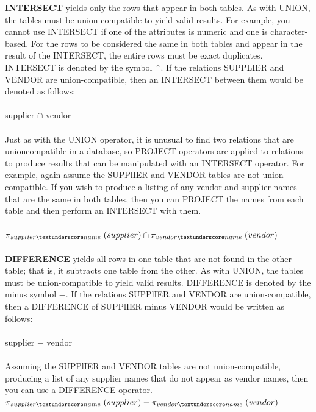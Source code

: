 \documentclass[a4paper, 12pt, titlepage]{report}
\begin{document}
{\textbf{INTERSECT} yields only the rows that appear in both tables. As with UNION, the tables must be union-compatible to yield valid results. For example, you cannot use INTERSECT if one of the attributes is numeric and one is character-based. For the rows
to be considered the same in both tables and appear in the result of the INTERSECT, the entire rows must be exact duplicates. INTERSECT is denoted by the symbol $\cap$. If the relations SUPPLIER and VENDOR are union-compatible, then an INTERSECT between them would be denoted as follows:\\ \\
supplier $\cap$ vendor\\ \\
Just as with the UNION operator, it is unusual to find two relations that are unioncompatible in a database, so PROJECT operators are applied to relations to produce results that can be manipulated with an INTERSECT operator. For example, again assume the
SUPPlIER and VENDOR tables are not union-compatible. If you wish to produce a listing of any vendor and supplier names that are the same in both tables, then you can PROJECT the names from each table and then perform an INTERSECT with them.\\ \\
$\pi_{supplier\textunderscore name} \hspace{0.1cm} (supplier) \cap \pi_{vendor\textunderscore name \hspace{0.1cm}} (vendor)$\\ \\
\textbf{DIFFERENCE} yields all rows in one table that are not found in the other table; that is, it subtracts one table from the other. As with UNION, the tables must be union-compatible to yield valid results. DIFFERENCE is denoted by the minus symbol $-$. If the relations SUPPlIER and VENDOR are union-compatible, then a DIFFERENCE of SUPPlIER minus VENDOR would be written as follows:\\ \\
supplier $-$ vendor\\ \\
Assuming the SUPPlIER and VENDOR tables are not union-compatible, producing a list of any supplier names that do not appear as vendor names, then you can use a DIFFERENCE operator.
$\pi_{supplier\textunderscore name} \hspace{0.1cm} (supplier) - \pi_{vendor\textunderscore name} \hspace{0.1cm} (vendor)$\\ \\
}
\end{document}
